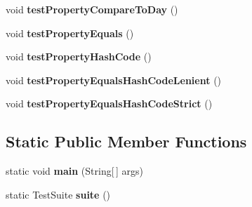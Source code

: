 \begin{DoxyCompactItemize}
\item 
\hypertarget{classorg_1_1joda_1_1time_1_1_test_year_month_day___properties_a0db2b334bac79a52d3929a797bc2328b}{void {\bfseries test\-Property\-Compare\-To\-Day} ()}\label{classorg_1_1joda_1_1time_1_1_test_year_month_day___properties_a0db2b334bac79a52d3929a797bc2328b}

\item 
\hypertarget{classorg_1_1joda_1_1time_1_1_test_year_month_day___properties_a30072587e3e028efe3aef39f99dcf426}{void {\bfseries test\-Property\-Equals} ()}\label{classorg_1_1joda_1_1time_1_1_test_year_month_day___properties_a30072587e3e028efe3aef39f99dcf426}

\item 
\hypertarget{classorg_1_1joda_1_1time_1_1_test_year_month_day___properties_ae6d607b3cc307aff6c49425edf3b877d}{void {\bfseries test\-Property\-Hash\-Code} ()}\label{classorg_1_1joda_1_1time_1_1_test_year_month_day___properties_ae6d607b3cc307aff6c49425edf3b877d}

\item 
\hypertarget{classorg_1_1joda_1_1time_1_1_test_year_month_day___properties_ac1d01d81fecd7d2bbb9be56856ffbfde}{void {\bfseries test\-Property\-Equals\-Hash\-Code\-Lenient} ()}\label{classorg_1_1joda_1_1time_1_1_test_year_month_day___properties_ac1d01d81fecd7d2bbb9be56856ffbfde}

\item 
\hypertarget{classorg_1_1joda_1_1time_1_1_test_year_month_day___properties_a541787b1d62ccf6bcaa5889daf31f685}{void {\bfseries test\-Property\-Equals\-Hash\-Code\-Strict} ()}\label{classorg_1_1joda_1_1time_1_1_test_year_month_day___properties_a541787b1d62ccf6bcaa5889daf31f685}

\end{DoxyCompactItemize}
\subsection*{Static Public Member Functions}
\begin{DoxyCompactItemize}
\item 
\hypertarget{classorg_1_1joda_1_1time_1_1_test_year_month_day___properties_acd9a7941998167d7dc0e7b34b8ecd2cd}{static void {\bfseries main} (String\mbox{[}$\,$\mbox{]} args)}\label{classorg_1_1joda_1_1time_1_1_test_year_month_day___properties_acd9a7941998167d7dc0e7b34b8ecd2cd}

\item 
\hypertarget{classorg_1_1joda_1_1time_1_1_test_year_month_day___properties_a4f21eac2040a4695cfcee4b8f13dddbb}{static Test\-Suite {\bfseries suite} ()}\label{classorg_1_1joda_1_1time_1_1_test_year_month_day___properties_a4f21eac2040a4695cfcee4b8f13dddbb}

\end{DoxyCompactItemize}
